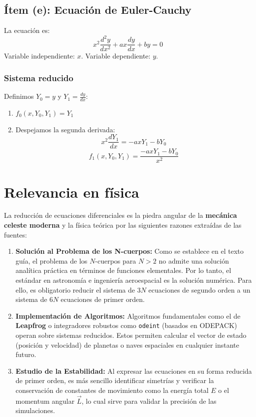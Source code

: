 \documentclass[a4paper]{article}
\begin{document}
\subsection{Ítem (e): Ecuación de Euler-Cauchy}

La ecuación es:
$$ x^2 \frac{d^2y}{dx^2} + ax \frac{dy}{dx} + by = 0 $$
Variable independiente: $x$. Variable dependiente: $y$.

\subsubsection{Sistema reducido}
Definimos $Y_0 = y$ y $Y_1 = \frac{dy}{dx}$:
\begin{enumerate}
    \item $f_0(x, Y_0, Y_1) = Y_1$
    \item Despejamos la segunda derivada:
    $$ x^2 \frac{dY_1}{dx} = -ax Y_1 - b Y_0 $$
    $$ f_1(x, Y_0, Y_1) = \frac{-ax Y_1 - b Y_0}{x^2} $$
\end{enumerate}

\section*{Relevancia en física}

La reducción de ecuaciones diferenciales es la piedra angular de la \textbf{mecánica celeste moderna} y la física teórica por las siguientes razones extraídas de las fuentes:

\begin{enumerate}
    \item \textbf{Solución al Problema de los N-cuerpos:} Como se establece en el texto guía, el problema de los $N$-cuerpos para $N > 2$ no admite una solución analítica práctica en términos de funciones elementales. Por lo tanto, el estándar en astronomía e ingeniería aeroespacial es la solución numérica. Para ello, es obligatorio reducir el sistema de $3N$ ecuaciones de segundo orden a un sistema de $6N$ ecuaciones de primer orden.
    \item \textbf{Implementación de Algoritmos:} Algoritmos fundamentales como el de \textbf{Leapfrog} o integradores robustos como \texttt{odeint} (basados en ODEPACK) operan sobre sistemas reducidos. Estos permiten calcular el vector de estado (posición y velocidad) de planetas o naves espaciales en cualquier instante futuro.
    \item \textbf{Estudio de la Estabilidad:} Al expresar las ecuaciones en su forma reducida de primer orden, es más sencillo identificar simetrías y verificar la conservación de constantes de movimiento como la energía total $E$ o el momentum angular $\vec{L}$, lo cual sirve para validar la precisión de las simulaciones.
\end{enumerate}
\end{document}
